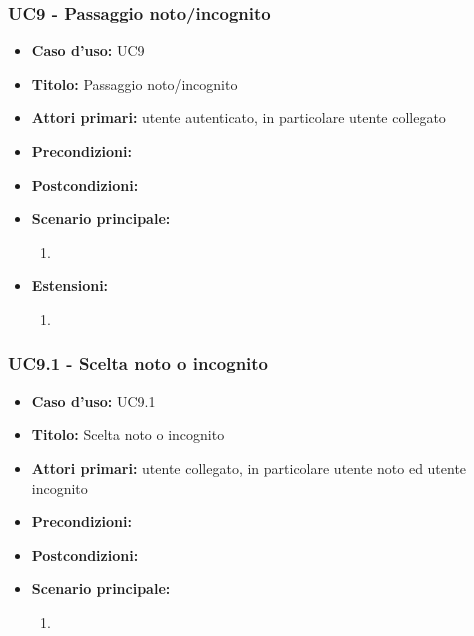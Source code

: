 \documentclass[casi-duso]{subfiles}
\begin{document}
\subsubsection{UC9 - Passaggio noto/incognito}
\label{subsub:uc9utente}
\begin{itemize}
  \item \textbf{Caso d’uso:} UC9
  \item \textbf{Titolo:} Passaggio noto/incognito
  \item \textbf{Attori primari:} utente autenticato, in particolare utente collegato
  \item \textbf{Precondizioni:} 
  \item \textbf{Postcondizioni:}
  \item \textbf{Scenario principale:} 
  \begin{enumerate}
    \item 
  \end{enumerate}  
  \item \textbf{Estensioni:} 
  \begin{enumerate}
    \item 
  \end{enumerate}  
\end{itemize}

\subsubsection{UC9.1 - Scelta noto o incognito}
\label{subsub:uc9.1utente}
\begin{itemize}
  \item \textbf{Caso d’uso:} UC9.1
  \item \textbf{Titolo:} Scelta noto o incognito
  \item \textbf{Attori primari:} utente collegato, in particolare utente noto ed utente incognito
  \item \textbf{Precondizioni:} 
  \item \textbf{Postcondizioni:}
  \item \textbf{Scenario principale:} 
  \begin{enumerate}
    \item 
  \end{enumerate}
\end{itemize}

\end{document}
